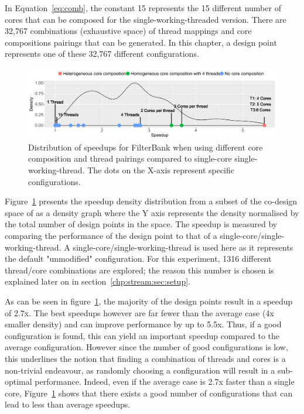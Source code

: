 In Equation~\ref{eq:comb}, the constant 15 represents the 15 different number of cores that can be composed for the single-working-threaded version.
There are 32,767 combinations (exhaustive space) of thread mappings and core compositions pairings that can be generated.
In this chapter, a design point represents one of these 32,767 different configurations.

\begin{figure}[t]
    \centering
    \includegraphics[width=1\textwidth]{streamit-paper/graphics/filterbank_motivation_4.pdf}
    \caption{Distribution of speedups for FilterBank when using different core composition and thread pairings compared to single-core single-working-thread. The dots on the X-axis represent specific configurations.}
     \label{fig:threadcoremotiv}
	 \vspace{-1em}
\end{figure}

Figure~\ref{fig:threadcoremotiv} presents the speedup density distribution from a subset of the co-design space of  as a density graph where the Y axis represents the density normalised by the total number of design points in the space.
The speedup is measured by comparing the performance of the design point to that of a single-core/single-working-thread.
A single-core/single-working-thread is used here as it represents the default "unmodified" configuration.
For this experiment, 1316 different thread/core combinations are explored; the reason this number is chosen is explained later on in section~\ref{chp:stream:sec:setup}.

As can be seen in figure~\ref{fig:threadcoremotiv}, the majority of the design points result in a speedup of 2.7x.
The best speedups however are far fewer than the average case (4x smaller density) and can improve performance by up to 5.5x.
Thus, if a good configuration is found, this can yield an important speedup compared to the average configuration.
However since the number of good configurations is low, this underlines the notion that finding a combination of threads and cores is a non-trivial endeavour, as randomly choosing a configuration will result in a sub-optimal performance.
Indeed, even if the average case is 2.7x faster than a single core, Figure~\ref{fig:threadcoremotiv} shows that there exists a good number of configurations that can lead to less than average speedups.

